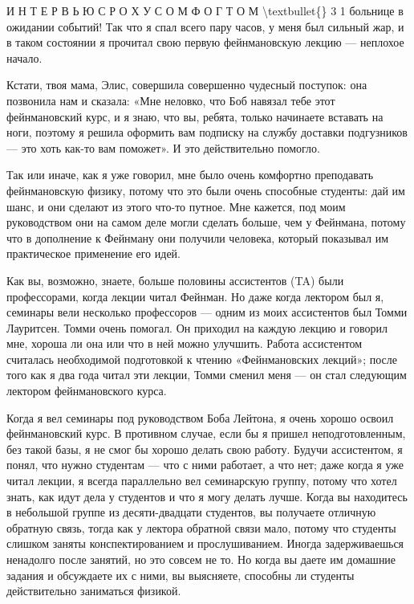 \documentclass[10pt,oneside]{article}
\begin{document}
И Н Т Е Р В Ь Ю  С  Р О Х У С О М  Ф О Г Т О М \textbackslash{}textbullet\{\} 3 1 больнице в ожидании событий! Так что я спал всего пару часов, у меня был сильный жар, и в таком состоянии я прочитал свою первую фейнмановскую лекцию --- неплохое начало.\par

Кстати, твоя мама, Элис, совершила совершенно чудесный поступок: она позвонила нам и сказала: «Мне неловко, что Боб навязал тебе этот фейнмановский курс, и я знаю, что вы, ребята, только начинаете вставать на ноги, поэтому я решила оформить вам подписку на службу доставки подгузников --- это хоть как-то вам поможет». И это действительно помогло.\par

Так или иначе, как я уже говорил, мне было очень комфортно преподавать фейнмановскую физику, потому что это были очень способные студенты: дай им шанс, и они сделают из этого что-то путное. Мне кажется, под моим руководством они на самом деле могли сделать больше, чем у Фейнмана, потому что в дополнение к Фейнману они получили человека, который показывал им практическое применение его идей.\par

Как вы, возможно, знаете, больше половины ассистентов (TA) были профессорами, когда лекции читал Фейнман. Но даже когда лектором был я, семинары вели несколько профессоров --- одним из моих ассистентов был Томми Лауритсен. Томми очень помогал. Он приходил на каждую лекцию и говорил мне, хороша ли она или что в ней можно улучшить. Работа ассистентом считалась необходимой подготовкой к чтению «Фейнмановских лекций»; после того как я два года читал эти лекции, Томми сменил меня --- он стал следующим лектором фейнмановского курса.\par

Когда я вел семинары под руководством Боба Лейтона, я очень хорошо освоил фейнмановский курс. В противном случае, если бы я пришел неподготовленным, без такой базы, я не смог бы хорошо делать свою работу. Будучи ассистентом, я понял, что нужно студентам --- что с ними работает, а что нет; даже когда я уже читал лекции, я всегда параллельно вел семинарскую группу, потому что хотел знать, как идут дела у студентов и что я могу делать лучше. Когда вы находитесь в небольшой группе из десяти-двадцати студентов, вы получаете отличную обратную связь, тогда как у лектора обратной связи мало, потому что студенты слишком заняты конспектированием и прослушиванием. Иногда задерживаешься ненадолго после занятий, но это совсем не то. Но когда вы даете им домашние задания и обсуждаете их с ними, вы выясняете, способны ли студенты действительно заниматься физикой.\par
\end{document}
